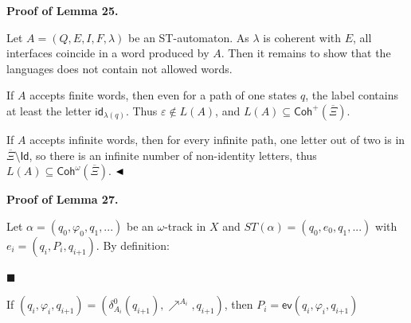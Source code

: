 \documentclass[10pt,a4paper]{article}
\begin{document}
\par\medskip\noindent\textbf{Proof of Lemma 25.}\par
 
 
Let $A=(Q,E,I,F,\lambda)$ be an ST-automaton. As $\lambda$ is coherent with $E$, all interfaces coincide in a word produced by $A$. Then it remains to show that the languages does not contain not allowed words.\par
 
 
 
If $A$ accepts finite words, then even for a path of one states $q$, the label contains at least the letter $\mathsf{id}_{\lambda(q)}$. Thus $\varepsilon\not\in L(A)$, and $L(A)\subseteq\mathsf{Coh}^{+}(\overline{\Xi})$.\par
 
 
 
If $A$ accepts infinite words, then for every infinite path, one letter out of two is in $\overline{\Xi}\setminus\mathsf{Id}$, so there is an infinite number of non-identity letters, thus $L(A)\subseteq\mathsf{Coh}^{\omega}(\overline{\Xi})$. $\hfill\blacktriangleleft$\par
 
 
 
 
\par\medskip\noindent\textbf{Proof of Lemma 27.}\par
 
 
Let $\alpha=(q_{0},\varphi_{0},q_{1},...)$ be an $\omega$-track in $X$ and $ST(\alpha)=(q_{0},e_{0},q_{1},...)$ with $e_{i}=(q_{i},P_{i},q_{i\text{+}1})$. By definition:\par
  
\par\noindent  $\blacksquare$ 
 
If $(q_{i},\varphi_{i},q_{i\text{+}1})=(\delta_{A_{i}}^{0}(q_{i\text{+}1}),\mathrel{\nearrow^{A_{i}}},q_{i\text{+}1})$, then $P_{i}=\mathsf{ev}(q_{i},\varphi_{i},q_{i\text{+}1})$\par
 
\end{document}
